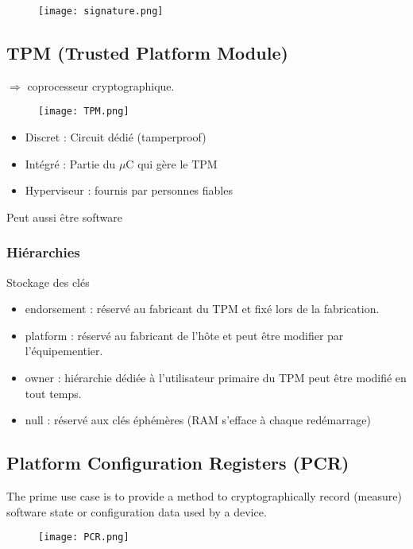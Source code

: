\begin{figure}[H]
    \centering
    \texttt{[image: signature.png]}
\end{figure}
\subsection{TPM (Trusted Platform Module)}
$\Rightarrow$ coprocesseur cryptographique.
\begin{figure}[H]
    \centering
    \texttt{[image: TPM.png]}
\end{figure}
\begin{itemize}
    \item Discret : Circuit dédié (tamperproof)
    \item Intégré : Partie du $\mu$C qui gère le TPM
    \item Hyperviseur : fournis par personnes fiables
\end{itemize}
Peut aussi être software
\subsubsection{Hiérarchies}
Stockage des clés
\begin{itemize}
    \item endorsement : réservé au fabricant du TPM et fixé lors de la fabrication.
    \item platform : réservé au fabricant de l'hôte et peut être modifier par l'équipementier.
    \item owner : hiérarchie dédiée à l'utilisateur primaire du TPM peut être modifié en tout temps.
    \item null : réservé aux clés éphémères (RAM s'efface à chaque redémarrage)
\end{itemize}

\subsection{Platform Configuration Registers (PCR)}
The prime use case is to provide a method to cryptographically record (measure) software state or configuration data used by a device.
\begin{figure}[H]
    \centering
    \texttt{[image: PCR.png]}
\end{figure}